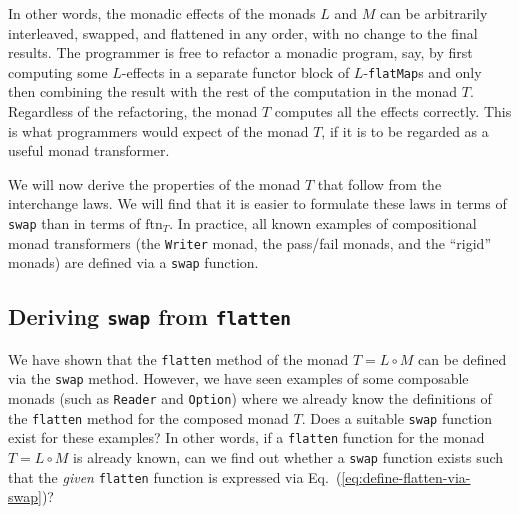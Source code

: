 In other words, the monadic effects of the monads $L$ and $M$ can
be arbitrarily interleaved, swapped, and flattened in any order, with
no change to the final results. The programmer is free to refactor
a monadic program, say, by first computing some $L$-effects in a
separate functor block of $L$-\lstinline!flatMap!s and only then
combining the result with the rest of the computation in the monad
$T$. Regardless of the refactoring, the monad $T$ computes all the
effects correctly. This is what programmers would expect of the monad
$T$, if it is to be regarded as a useful monad transformer.

We will now derive the properties of the monad $T$ that follow from
the interchange laws. We will find that it is easier to formulate
these laws in terms of \lstinline!swap! than in terms of $\text{ftn}_{T}$.
In practice, all known examples of compositional monad transformers
(the \lstinline!Writer! monad, the pass/fail monads, and the \textsf{``}rigid\textsf{''}
monads) are defined via a \lstinline!swap! function.

\subsection{Deriving \texttt{swap} from \texttt{flatten}\label{subsec:Deriving-swap-from-flatten}}

We have shown that the \texttt{}\lstinline!flatten! method of the
monad $T=L\circ M$ can be defined via the \texttt{}\lstinline!swap!
method. However, we have seen examples of some composable monads (such
as \texttt{}\lstinline!Reader! and \lstinline!Option!) where we
already know the definitions of the \texttt{}\lstinline!flatten!
method for the composed monad $T$. Does a suitable \texttt{}\lstinline!swap!
function exist for these examples? In other words, if a \texttt{}\lstinline!flatten!
function for the monad $T=L\circ M$ is already known, can we find
out whether a \texttt{}\lstinline!swap! function exists such that
the\emph{ given} \texttt{}\lstinline!flatten! function is expressed
via Eq.~(\ref{eq:define-flatten-via-swap})? 

